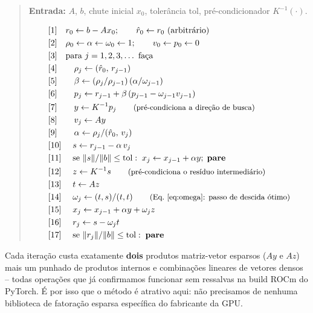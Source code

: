 \documentclass[11pt,a4paper]{article}
\begin{document}
\begingroup
\renewcommand{\arraystretch}{1.15}
\begin{quote}
\textbf{Entrada:} $A$, $b$, chute inicial $x_0$, tolerância
$\text{tol}$, pré-condicionador $K^{-1}(\cdot)$.

\begin{align*}
  &[1]\quad r_0 \gets b - Ax_0; \qquad \hat r_0 \gets r_0 \text{ (arbitrário)} \\
  &[2]\quad \rho_0 \gets \alpha \gets \omega_0 \gets 1; \qquad v_0 \gets p_0 \gets 0 \\
  &[3]\quad \text{para } j = 1, 2, 3, \dots \text{ faça} \\
  &[4]\qquad \rho_j \gets (\hat r_0,\, r_{j-1}) \\
  &[5]\qquad \beta \gets (\rho_j / \rho_{j-1})\,(\alpha / \omega_{j-1}) \\
  &[6]\qquad p_j \gets r_{j-1} + \beta\,(p_{j-1} - \omega_{j-1} v_{j-1}) \\
  &[7]\qquad y \gets K^{-1} p_j \qquad \text{\small(pré-condiciona a direção de busca)} \\
  &[8]\qquad v_j \gets A y \\
  &[9]\qquad \alpha \gets \rho_j / (\hat r_0,\, v_j) \\
  &[10]\quad\ s \gets r_{j-1} - \alpha\, v_j \\
  &[11]\quad\ \text{se } \|s\|/\|b\| \le \text{tol}: \; x_j \gets x_{j-1} + \alpha y; \; \textbf{pare} \\
  &[12]\quad\ z \gets K^{-1} s \qquad \text{\small(pré-condiciona o resíduo intermediário)} \\
  &[13]\quad\ t \gets A z \\
  &[14]\quad\ \omega_j \gets (t, s) / (t, t) \qquad \text{\small(Eq.~\eqref{eq:omega}: passo de descida ótimo)} \\
  &[15]\quad\ x_j \gets x_{j-1} + \alpha y + \omega_j z \\
  &[16]\quad\ r_j \gets s - \omega_j t \\
  &[17]\quad\ \text{se } \|r_j\|/\|b\| \le \text{tol}: \; \textbf{pare}
\end{align*}
\end{quote}
\endgroup

Cada iteração custa exatamente \textbf{dois} produtos matriz-vetor
esparsos ($Ay$ e $Az$) mais um punhado de produtos internos e
combinações lineares de vetores densos -- todas operações que já
confirmamos funcionar sem ressalvas na build ROCm do PyTorch. É por
isso que o método é atrativo aqui: não precisamos de nenhuma biblioteca
de fatoração esparsa específica do fabricante da GPU.
\end{document}
